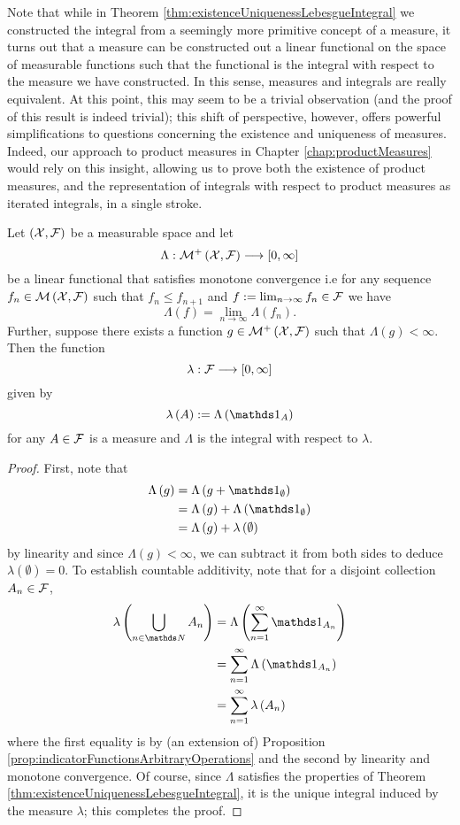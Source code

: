 Note that while in Theorem \ref{thm:existenceUniquenessLebesgueIntegral}
we constructed the integral from a seemingly more primitive concept
of a measure, it turns out that a measure can be constructed out a
linear functional on the space of measurable functions such that the
functional is the integral with respect to the measure we have constructed.
In this sense, measures and integrals are really equivalent. At this
point, this may seem to be a trivial observation (and the proof of
this result is indeed trivial); this shift of perspective, however,
offers powerful simplifications to questions concerning the existence
and uniqueness of measures. Indeed, our approach to product measures
in Chapter \ref{chap:productMeasures} would rely on this insight,
allowing us to prove both the existence of product measures, and the
representation of integrals with respect to product measures as iterated
integrals, in a single stroke.
\begin{thm}
\label{thm:integralMeasureEquivalence}Let $\left(\mathcal{X},\mathcal{F}\right)$ be
a measurable space and let 
\[
\Lambda:\mathcal{M}^{+}\left(\mathcal{X},\mathcal{F}\right)\longrightarrow\left[0,\infty\right]
\]
be a linear functional that satisfies monotone convergence i.e for
any sequence $f_{n}\in\mathcal{M}\left(\mathcal{X},\mathcal{F}\right)$ such that $f_{n}\leq f_{n+1}$
and $f:=\lim_{n\to\infty}f_{n}\in\mathcal{F}$ we have 
\[
\Lambda\left(f\right)=\lim_{n\to\infty}\Lambda\left(f_{n}\right).
\]
Further, suppose there exists a function $g\in\mathcal{M}^{+}\left(\mathcal{X},\mathcal{F}\right)$
such that $\Lambda\left(g\right)<\infty$. Then the function 
\[
\lambda:\mathcal{F}\longrightarrow\left[0,\infty\right]
\]
given by 
\[
\lambda\left(A\right):=\Lambda\left(\indicate_{A}\right)
\]
for any $A\in\mathcal{F}$ is a measure and $\Lambda$ is the integral with
respect to $\lambda$.
\end{thm}

\begin{proof}
First, note that 
\begin{align*}
\Lambda\left(g\right) & =\Lambda\left(g+\indicate_{\emptyset}\right)\\
 & =\Lambda\left(g\right)+\Lambda\left(\indicate_{\emptyset}\right)\\
 & =\Lambda\left(g\right)+\lambda\left(\emptyset\right)
\end{align*}
by linearity and since $\Lambda\left(g\right)<\infty$, we can subtract
it from both sides to deduce $\lambda\left(\emptyset\right)=0.$ To
establish countable additivity, note that for a disjoint collection
$A_{n}\in\mathcal{F}$, 
\begin{align*}
\lambda\left(\bigcup_{n\in\N}A_{n}\right) & =\Lambda\left(\sum_{n=1}^{\infty}\indicate_{A_{n}}\right)\\
 & =\sum_{n=1}^{\infty}\Lambda\left(\indicate_{A_{n}}\right)\\
 & =\sum_{n=1}^{\infty}\lambda\left(A_{n}\right)
\end{align*}
where the first equality is by (an extension of) Proposition \ref{prop:indicatorFunctionsArbitraryOperations}
and the second by linearity and monotone convergence. Of course, since
$\Lambda$ satisfies the properties of Theorem \ref{thm:existenceUniquenessLebesgueIntegral},
it is the unique integral induced by the measure $\lambda$; this
completes the proof.
\end{proof}

